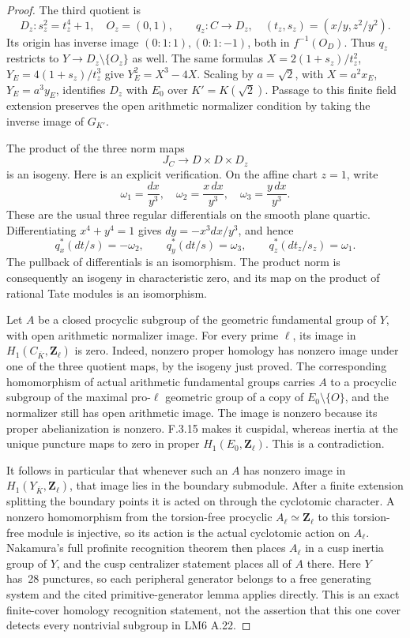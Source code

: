 \begin{proof}
The third quotient is
\[
 D_z:s_z^2=t_z^4+1,\quad O_z=(0,1),\qquad
 q_z:C\to D_z,\quad(t_z,s_z)=(x/y,z^2/y^2).
\]
Its origin has inverse image $(0:1:1),(0:1:-1)$, both in $f^{-1}(O_D)$. Thus $q_z$ restricts to $Y\to D_z\setminus\{O_z\}$ as well. The same formulas $X=2(1+s_z)/t_z^2$, $Y_E=4(1+s_z)/t_z^3$ give $Y_E^2=X^3-4X$. Scaling by $a=\sqrt2$, with $X=a^2x_E$, $Y_E=a^3y_E$, identifies $D_z$ with $E_0$ over $K'=K(\sqrt2)$. Passage to this finite field extension preserves the open arithmetic normalizer condition by taking the inverse image of $G_{K'}$.

The product of the three norm maps
\[
 J_C\longrightarrow D\times D\times D_z
\]
is an isogeny. Here is an explicit verification. On the affine chart $z=1$, write
\[
 \omega_1=\frac{dx}{y^3},\quad
 \omega_2=\frac{x\,dx}{y^3},\quad
 \omega_3=\frac{y\,dx}{y^3}.
\]
These are the usual three regular differentials on the smooth plane quartic. Differentiating $x^4+y^4=1$ gives $dy=-x^3dx/y^3$, and hence
\[
 q_x^*(dt/s)=-\omega_2,\qquad
 q_y^*(dt/s)=\omega_3,\qquad
 q_z^*(dt_z/s_z)=\omega_1.
\]
The pullback of differentials is an isomorphism. The product norm is consequently an isogeny in characteristic zero, and its map on the product of rational Tate modules is an isomorphism.

Let $A$ be a closed procyclic subgroup of the geometric fundamental group of $Y$, with open arithmetic normalizer image. For every prime $\ell$, its image in $H_1(C_{\overline K},\mathbf Z_\ell)$ is zero. Indeed, nonzero proper homology has nonzero image under one of the three quotient maps, by the isogeny just proved. The corresponding homomorphism of actual arithmetic fundamental groups carries $A$ to a procyclic subgroup of the maximal pro-$\ell$ geometric group of a copy of $E_0\setminus\{O\}$, and the normalizer still has open arithmetic image. The image is nonzero because its proper abelianization is nonzero. F.3.15 makes it cuspidal, whereas inertia at the unique puncture maps to zero in proper $H_1(E_0,\mathbf Z_\ell)$. This is a contradiction.

It follows in particular that whenever such an $A$ has nonzero image in $H_1(Y_{\overline K},\mathbf Z_\ell)$, that image lies in the boundary submodule. After a finite extension splitting the boundary points it is acted on through the cyclotomic character. A nonzero homomorphism from the torsion-free procyclic $A_\ell\simeq\mathbf Z_\ell$ to this torsion-free module is injective, so its action is the actual cyclotomic action on $A_\ell$. Nakamura's full profinite recognition theorem\cite[Theorem~2.1.1,p.~94]{AuditNakamura1994} then places $A_\ell$ in a cusp inertia group of $Y$, and the cusp centralizer statement places all of $A$ there\cite[Lemma~2.1.2,p.~95]{AuditNakamura1994}. Here $Y$ has~28 punctures, so each peripheral generator belongs to a free generating system and the cited primitive-generator lemma applies directly. This is an exact finite-cover homology recognition statement, not the assertion that this one cover detects every nontrivial subgroup in LM6 A.22.

\end{proof}

